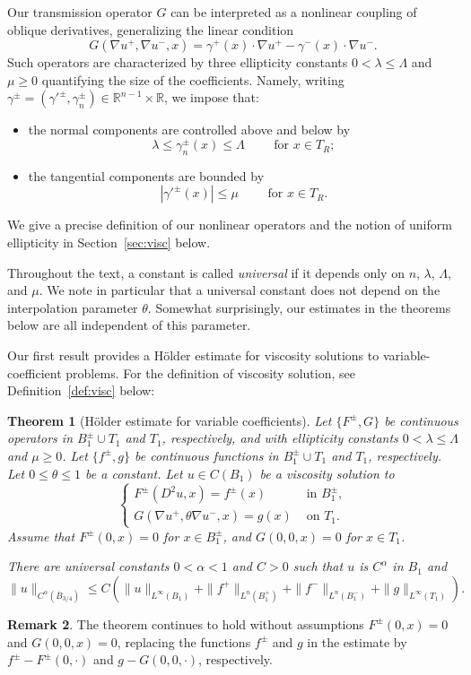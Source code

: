 \documentclass[letter,11pt]{amsart}
\newcommand{\R}{\mathbb{R}}
\newtheorem{thm}{Theorem}[section]
\theoremstyle{definition}
\newtheorem{rem}[thm]{Remark}
\numberwithin{equation}{section}
\begin{document}
Our transmission operator $G$ can be interpreted as a nonlinear coupling of oblique derivatives, generalizing the linear condition
\[
G(\nabla u^{+}, \nabla u^{-}, x) = \gamma^{+}(x) \cdot \nabla u^{+} - \gamma^{-}(x) \cdot \nabla u^{-}.
\]
Such operators are characterized by three ellipticity constants $0 < \lambda \leq \Lambda$ and $\mu \geq 0$ quantifying the size of the coefficients.
Namely, writing $\gamma^{\pm} = (\gamma'^{\pm}, \gamma^{\pm}_{n}) \in \R^{n-1} \times \R$, we impose that:
\begin{itemize}
\item 
the normal components are controlled above and below by 
\[
\lambda \leq \gamma_{n}^{\pm}(x) \leq \Lambda \qquad \text{ for } x \in T_R;
\] 
\item 
the tangential components are bounded by
\[
|\gamma'^{\pm}(x)| \leq \mu \qquad \text{ for } x \in T_R.
\]
\end{itemize}
We give a precise definition of our nonlinear operators and the notion of uniform ellipticity in Section~\ref{sec:visc} below.

\medskip

Throughout the text, a constant is called \emph{universal} if it depends only on $n$, $\lambda$, $\Lambda$, and $\mu$.
We note in particular that a universal constant does not depend on the interpolation parameter $\theta$.
Somewhat surprisingly, our estimates in the theorems below are all independent of this parameter.

\medskip

Our first result provides a H\"{o}lder estimate for viscosity solutions to variable-coefficient problems.
For the definition of viscosity solution, see Definition~\ref{def:visc} below:

\begin{thm}
[H\"{o}lder estimate for variable coefficients]
\label{thm:holder:intro}
Let $\{F^{\pm}, G\}$ be continuous operators in $B_1^{\pm} \cup T_1$ and $T_1$, respectively, and with ellipticity constants $0 < \lambda \leq \Lambda$ and $\mu \geq 0$.
Let $\{f^{\pm}, g\}$ be continuous functions in $B_1^{\pm} \cup T_1$ and $T_1$, respectively.
Let $0 \leq \theta \leq 1$ be a constant.
Let $u \in C(B_1)$ be a viscosity solution to
\[
\begin{cases}
F^{\pm}(D^2u, x) = f^{\pm}(x) & \text{ in } B_1^{\pm},\\
G(\nabla u^{+}, \theta \nabla u^{-}, x) =g(x) & \text{ on } T_1.
\end{cases}
\]
Assume that $F^{\pm}(0,x) = 0$ for $x \in B_1^{\pm}$, and $G(0,0,x) = 0$ for $x \in T_1$.

There are universal constants $0 < \alpha < 1$ and $C > 0$ such that $u$ is $C^{\alpha}$ in $B_1$ and 
\[
\|u\|_{C^{\alpha}(\overline{B}_{3/4})} 
\leq C \left( \|u\|_{L^{\infty}(B_1)}
+\|f^{+}\|_{L^n(B_1^{+})} + \|f^{-} \|_{L^n(B_1^{-})} +\|g \|_{L^{\infty}(T_1)}
\right).
\]
\end{thm}
\begin{rem}
The theorem continues to hold without assumptions $F^{\pm}(0,x) = 0$ and $G(0,0,x) = 0$,
replacing the functions $f^{\pm}$ and $g$ in the estimate by $f^{\pm} - F^{\pm}(0, \cdot)$ and $g - G(0,0,\cdot)$, respectively.
\end{rem}
\end{document}
